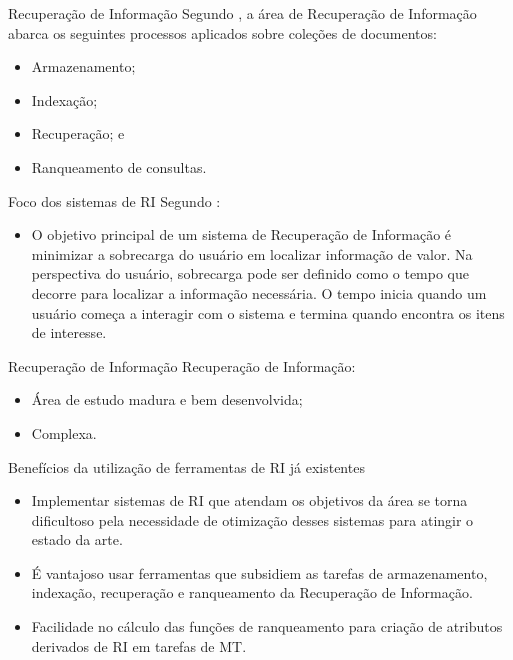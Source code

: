 \documentclass[%
  10pt,%
  aspectratio = 169,%
  compress,%
  t,%
]{beamer}%
\begin{document}
    \begin{frame}{}{Recuperação de Informação}
        Segundo \cite[p.~5--8]{Baeza-Yates2011}, a área de Recuperação de Informação abarca os seguintes processos aplicados sobre coleções de documentos:
        \begin{itemize}
            \item Armazenamento;
            \item Indexação;
            \item Recuperação; e
            \item Ranqueamento de consultas.
        \end{itemize}
        
        \begin{block}{Foco dos sistemas de RI}
            Segundo \cite[p.~2, tradução nossa]{KowalskiIRAA201}:
            \begin{itemize}
                \item O objetivo principal de um sistema de Recuperação de Informação é minimizar a sobrecarga do usuário em localizar informação de valor. 
                Na perspectiva do usuário, sobrecarga pode ser definido como o tempo que decorre para localizar a informação necessária.
                O tempo inicia quando um usuário começa a interagir com o sistema e termina quando encontra os itens de interesse.
            \end{itemize}
        \end{block}
    \end{frame}
    
    \begin{frame}{}{Recuperação de Informação}
        Recuperação de Informação:
        \begin{itemize}
            \item Área de estudo madura e bem desenvolvida;
            \item Complexa.
        \end{itemize}
        
        \begin{block}{Benefícios da utilização de ferramentas de RI já existentes}
            \begin{itemize}
                \item Implementar sistemas de RI que atendam os objetivos da área se torna dificultoso pela necessidade de otimização desses sistemas para atingir o estado da arte.
                
                \item É vantajoso usar ferramentas que subsidiem as tarefas de armazenamento, indexação, recuperação e ranqueamento da Recuperação de Informação.
                
                \item Facilidade no cálculo das funções de ranqueamento para criação de atributos derivados de RI em tarefas de MT.
            \end{itemize}
        \end{block}
    \end{frame}
    
\end{document}
